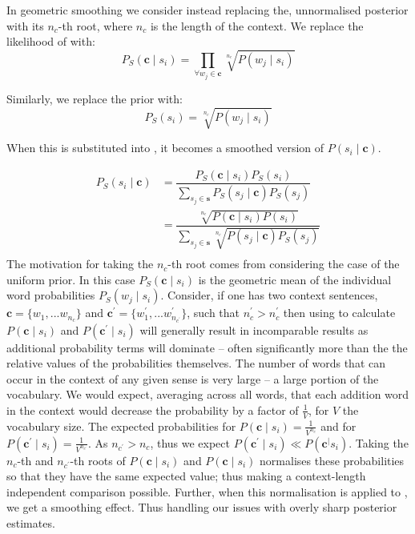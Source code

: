 \documentclass{sig-alternate}
\renewcommand{\c}{\mathbf{c}}
\newcommand{\s}{\mathbf{s}}
\begin{document}
In geometric smoothing we consider instead replacing the, unnormalised posterior  with its $n_c$-th root, where $n_c$ is the length of the context.
We replace the likelihood of  with:
\begin{equation} \label{eq:contrextprobsmooth}
P_S(\c \mid s_{i})=\prod_{\forall w_{j}\in\c}\sqrt[n_c]{P(w_{j} \mid s_{i})}
\end{equation}

Similarly, we replace the prior with:
\begin{equation} \label{eq:priorsmoothed}
P_S(s_{i})= \sqrt[n_c]{P(w_{j} \mid s_{i})}
\end{equation}


When this is substituted into , it becomes a smoothed version of $P(s_{i} \mid \c)$.


\begin{equation} \label{eq:generalwsdsmoothed}
\begin{aligned}
P_S(s_{i}\mid\c) %
&=\dfrac{P_{S}(\c\mid s_{i})P_S(s_{i})}
{\sum_{s_{j}\in\s} P_{S}(s_{j}\mid\c) P_S(s_{j})} \\
%
&=\dfrac{\sqrt[n_c]{P(\c\mid s_{i})P(s_{i})}}
{\sum_{s_{j}\in\s} \sqrt[n_c]{P(s_{j}\mid\c)P_S(s_{j})}} \\
%
\end{aligned}
\end{equation}
The motivation for taking the $n_c$-th root comes from considering the case of the uniform prior.
In this case $P_S(\c \mid s_{i})$ is the geometric mean of the individual word probabilities $P_S(w_j \mid s_{i})$.
Consider, if one has two context sentences, $\c=\{w_1,...w_{n_c}\}$ and $\c^\prime=\{w_1^\prime,...w^\prime_{n_{c^\prime}}\}$, such that $n_c^\prime > n_c^\prime$
then using  to calculate $P(\c \mid s_{i})$ and $P(\c^\prime \mid s_{i})$ will generally result in incomparable results as additional probability terms will dominate -- often significantly more than the the relative values of the probabilities themselves.
The number of words that can occur in the context of any given sense is very large -- a large portion of the vocabulary. We would expect, averaging across all words, that each addition word in the context would decrease the probability by a factor of $\frac{1}{V}$, for $V$ the vocabulary size. 
The expected probabilities for $P(\c \mid s_{i}) = \frac{1}{V^{n_c}}$ and for $P(\c^\prime \mid s_{i}) = \frac{1}{V^{n_{c^\prime}}}$. As $n_{c^\prime} > n_c$, thus we expect $P(\c^\prime \mid s_{i}) \ll P(\c^ \mid s_{i})$.
Taking the $n_{c}$-th and $n_{c^\prime}$-th roots of $P(\c \mid s_{i})$ and $P(\c \mid s_{i})$ normalises these probabilities so that they have the same expected value; thus making a context-length independent comparison possible.
Further, when this normalisation is applied to , we get a smoothing effect. Thus handling our issues with overly sharp posterior estimates.
\end{document}
